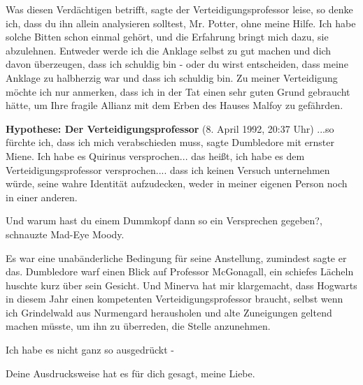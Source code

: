 \glqq{}Was diesen Verdächtigen betrifft\grqq{}, sagte der Verteidigungsprofessor
leise, \glqq{}so denke ich, dass du ihn allein analysieren solltest, Mr. Potter,
ohne meine Hilfe. Ich habe solche Bitten schon einmal gehört, und die Erfahrung
bringt mich dazu, sie abzulehnen. Entweder werde ich die Anklage selbst zu gut
machen und dich davon überzeugen, dass ich schuldig bin - oder du wirst
entscheiden, dass meine Anklage zu halbherzig war und dass ich schuldig bin. Zu
meiner Verteidigung möchte ich nur anmerken, dass ich in der Tat einen sehr
guten Grund gebraucht hätte, um Ihre fragile Allianz mit dem Erben des Hauses
Malfoy zu gefährden.\grqq{}

\textbf{Hypothese: Der Verteidigungsprofessor} (8. April 1992, 20:37 Uhr) \glqq{}
...so fürchte ich, dass ich mich verabschieden muss\grqq{}, sagte Dumbledore mit
ernster Miene. \glqq{}Ich habe es Quirinus versprochen... das heißt, ich habe es
dem Verteidigungsprofessor versprochen.... dass ich keinen Versuch unternehmen
würde, seine wahre Identität aufzudecken, weder in meiner eigenen Person noch in
einer anderen.\grqq{}

\glqq{}Und warum hast du einem Dummkopf dann so ein Versprechen gegeben?\grqq{},
schnauzte Mad-Eye Moody.

\glqq{}Es war eine unabänderliche Bedingung für seine Anstellung, zumindest sagte
er das.\grqq{} Dumbledore warf einen Blick auf Professor McGonagall, ein
schiefes Lächeln huschte kurz über sein Gesicht. \glqq{}Und Minerva hat mir
klargemacht, dass Hogwarts in diesem Jahr einen kompetenten
Verteidigungsprofessor braucht, selbst wenn ich Grindelwald aus Nurmengard
herausholen und alte Zuneigungen geltend machen müsste, um ihn zu überreden, die
Stelle anzunehmen.\grqq{}

\glqq{}Ich habe es nicht ganz so ausgedrückt -\grqq{}

\glqq{}Deine Ausdrucksweise hat es für dich gesagt, meine Liebe.\grqq{}

